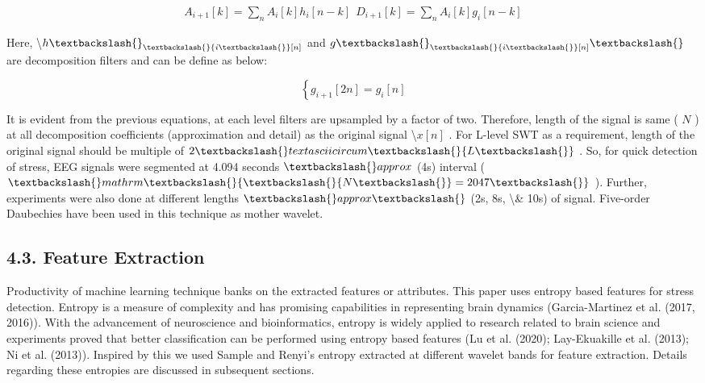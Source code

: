 \documentclass{article}
\begin{document}
\begin{equation}
\begin{array}{l}{{\displaystyle{A_{i+1}[k]=\sum_{n}A_{i}[k]h_{i}[n-k]}}}\ {{\displaystyle{}}}\ {{\displaystyle{D_{i+1}[k]=\sum_{n}A_{i}[k]g_{i}[n-k]}}}\end{array}
\end{equation}



Here, \textbackslash{}$h\textbackslash{}_\textbackslash{}{i\textbackslash{}}[n]$ and $g\textbackslash{}_\textbackslash{}{i\textbackslash{}}[n]\textbackslash{}$ are decomposition filters and can be define as below:

\begin{equation}
\left\{{{g}_{i+1}}[2n]={{g}_{i}}[n]\right.
\end{equation}



It is evident from the previous equations, at each level filters are upsampled by a factor of two. Therefore, length of the signal is same ( $N$ ) at all decomposition coefficients (approximation and detail) as the original signal \textbackslash{}$x[n]$ . For L-level SWT as a requirement, length of the original signal should be multiple of $2\textbackslash{}textasciicircum{}\textbackslash{}{L\textbackslash{}}$ . So, for quick detection of stress, EEG signals were segmented at 4.094 seconds $\textbackslash{}approx$ (4s) interval ( $\textbackslash{}mathrm\textbackslash{}{\textbackslash{}{N\textbackslash{}}=2047\textbackslash{}}$ ). Further, experiments were also done at different lengths $\textbackslash{}approx\textbackslash{}$ (2s, 8s, \textbackslash{}& 10s) of signal. Five-order Daubechies have been used in this technique as mother wavelet.

\subsection{4.3. Feature Extraction}

Productivity of machine learning technique banks on the extracted features or attributes. This paper uses entropy based features for stress detection. Entropy is a measure of complexity and has promising capabilities in representing brain dynamics (Garcia-Martinez et al. (2017, 2016)). With the advancement of neuroscience and bioinformatics, entropy is widely applied to research related to brain science and experiments proved that better classification can be performed using entropy based features (Lu et al. (2020); Lay-Ekuakille et al. (2013); Ni et al. (2013)). Inspired by this we used Sample and Renyi’s entropy extracted at different wavelet bands for feature extraction. Details regarding these entropies are discussed in subsequent sections.
\end{document}
